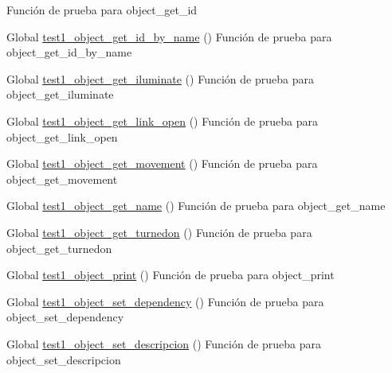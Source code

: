 \begin{DoxyRefList}
%
Función de prueba para object\+\_\+get\+\_\+id  
\item[Global \mbox{\hyperlink{object__test_8c_a2a113343f259d92142fde75b9c04c4df}{test1\+\_\+object\+\_\+get\+\_\+id\+\_\+by\+\_\+name}} ()]\label{test__test000148}%
%
Función de prueba para object\+\_\+get\+\_\+id\+\_\+by\+\_\+name  
\item[Global \mbox{\hyperlink{object__test_8c_af8b526a9b48e2490acfa9396a0e5867b}{test1\+\_\+object\+\_\+get\+\_\+iluminate}} ()]\label{test__test000157}%
%
Función de prueba para object\+\_\+get\+\_\+iluminate  
\item[Global \mbox{\hyperlink{object__test_8c_a5fbb905fe5527a89a64f402f8e01045c}{test1\+\_\+object\+\_\+get\+\_\+link\+\_\+open}} ()]\label{test__test000171}%
%
Función de prueba para object\+\_\+get\+\_\+link\+\_\+open  
\item[Global \mbox{\hyperlink{object__test_8c_a360f21c3e2ac06047d742d0423b406c4}{test1\+\_\+object\+\_\+get\+\_\+movement}} ()]\label{test__test000153}%
%
Función de prueba para object\+\_\+get\+\_\+movement  
\item[Global \mbox{\hyperlink{object__test_8c_ad2411bc3cc47c9905e63a3d9c561d369}{test1\+\_\+object\+\_\+get\+\_\+name}} ()]\label{test__test000141}%
%
Función de prueba para object\+\_\+get\+\_\+name  
\item[Global \mbox{\hyperlink{object__test_8c_afbca5c557743f093d1f05aa1238ea540}{test1\+\_\+object\+\_\+get\+\_\+turnedon}} ()]\label{test__test000161}%
%
Función de prueba para object\+\_\+get\+\_\+turnedon  
\item[Global \mbox{\hyperlink{object__test_8c_a30b89e40f10485eea39398a21f5a4441}{test1\+\_\+object\+\_\+print}} ()]\label{test__test000151}%
%
Función de prueba para object\+\_\+print  
\item[Global \mbox{\hyperlink{object__test_8c_aef1285f1a9ad407e927375aba038a706}{test1\+\_\+object\+\_\+set\+\_\+dependency}} ()]\label{test__test000165}%
%
Función de prueba para object\+\_\+set\+\_\+dependency  
\item[Global \mbox{\hyperlink{object__test_8c_a0f107a04ebae63bc02b8281374b1e94c}{test1\+\_\+object\+\_\+set\+\_\+descripcion}} ()]\label{test__test000145}%
%
Función de prueba para object\+\_\+set\+\_\+descripcion  

\end{DoxyRefList}
